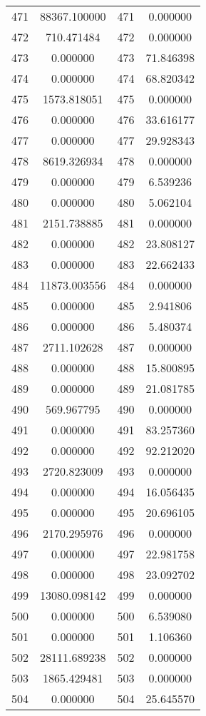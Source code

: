 \documentclass[12pt]{article}
\begin{document}
\begin{longtable}{@{}cccc@{}}
471 & 88367.100000 & 471 & 0.000000 \\
472 & 710.471484 & 472 & 0.000000 \\
473 & 0.000000 & 473 & 71.846398 \\
474 & 0.000000 & 474 & 68.820342 \\
475 & 1573.818051 & 475 & 0.000000 \\
476 & 0.000000 & 476 & 33.616177 \\
477 & 0.000000 & 477 & 29.928343 \\
478 & 8619.326934 & 478 & 0.000000 \\
479 & 0.000000 & 479 & 6.539236 \\
480 & 0.000000 & 480 & 5.062104 \\
481 & 2151.738885 & 481 & 0.000000 \\
482 & 0.000000 & 482 & 23.808127 \\
483 & 0.000000 & 483 & 22.662433 \\
484 & 11873.003556 & 484 & 0.000000 \\
485 & 0.000000 & 485 & 2.941806 \\
486 & 0.000000 & 486 & 5.480374 \\
487 & 2711.102628 & 487 & 0.000000 \\
488 & 0.000000 & 488 & 15.800895 \\
489 & 0.000000 & 489 & 21.081785 \\
490 & 569.967795 & 490 & 0.000000 \\
491 & 0.000000 & 491 & 83.257360 \\
492 & 0.000000 & 492 & 92.212020 \\
493 & 2720.823009 & 493 & 0.000000 \\
494 & 0.000000 & 494 & 16.056435 \\
495 & 0.000000 & 495 & 20.696105 \\
496 & 2170.295976 & 496 & 0.000000 \\
497 & 0.000000 & 497 & 22.981758 \\
498 & 0.000000 & 498 & 23.092702 \\
499 & 13080.098142 & 499 & 0.000000 \\
500 & 0.000000 & 500 & 6.539080 \\
501 & 0.000000 & 501 & 1.106360 \\
502 & 28111.689238 & 502 & 0.000000 \\
503 & 1865.429481 & 503 & 0.000000 \\
504 & 0.000000 & 504 & 25.645570 \\

\end{longtable}
\end{document}
